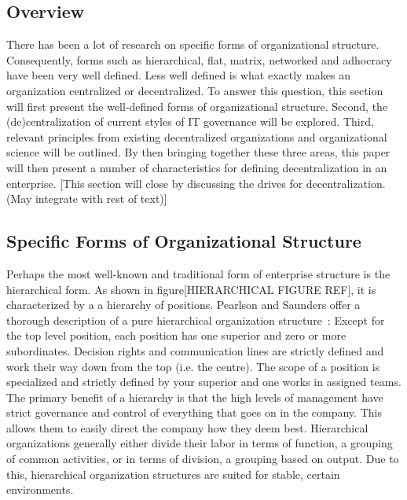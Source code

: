 \subsection{Overview}
There has been a lot of research on specific forms of organizational structure. Consequently, forms such as hierarchical, flat, matrix, networked and adhocracy have been very well defined. Less well defined is what exactly makes an organization centralized or decentralized. To answer this question, this section will first present the well-defined forms of organizational structure. Second, the (de)centralization of current styles of IT governance will be explored. Third, relevant principles from existing decentralized organizations and organizational science will be outlined. By then bringing together these three areas, this paper will then present a number of characteristics for defining decentralization in an enterprise. [This section will close by discussing the drives for decentralization. (May integrate with rest of text)]

\subsection{Specific Forms of Organizational Structure}
\label{org:form}

Perhaps the most well-known and traditional form of enterprise structure is the hierarchical form. As shown in figure[HIERARCHICAL FIGURE REF], it is characterized by a a hierarchy of positions. Pearlson and Saunders offer a thorough description of a pure hierarchical organization structure~\cite{pearlson2009}: Except for the top level position, each position has one superior and zero or more subordinates. Decision rights and communication lines are strictly defined and work their way down from the top (i.e. the centre). The scope of a position is specialized and strictly defined by your superior and one works in assigned teams. The primary benefit of a hierarchy is that the high levels of management have strict governance and control of everything that goes on in the company. This allows them to easily direct the company how they deem best. Hierarchical organizations generally either divide their labor in terms of function, a grouping of common activities, or in terms of division, a grouping based on output. Due to this, hierarchical organization structures are suited for stable, certain environments. 

